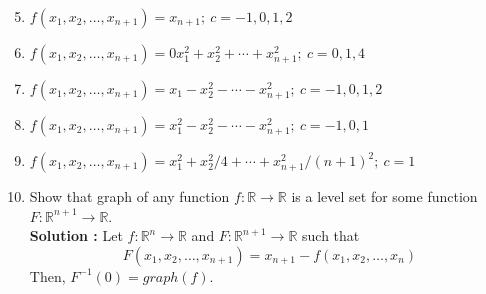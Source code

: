 \begin{enumerate} 
	\setcounter{enumi}{4}
	\item $f(x_1,x_2,\dots,x_{n+1}) = x_{n+1};\ c = -1,0,1,2$
	\item $f(x_1,x_2,\dots,x_{n+1}) = 0x_1^2 + x_2^2 + \dotsb + x_{n+1}^2;\ c = 0,1,4$
	\item $f(x_1,x_2,\dots,x_{n+1}) = x_1 - x_2^2 -\dotsb - x_{n+1}^2;\ c = -1,0,1,2$
	\item $f(x_1,x_2,\dots,x_{n+1}) = x_1^2 - x_2^2 - \dotsb - x_{n+1}^2;\ c = -1,0,1$
	\item $f(x_1,x_2,\dots,x_{n+1}) = x_1^2 + x_2^2/4 + \dotsb + x_{n+1}^2/(n+1)^2;\ c = 1$
	\item Show that graph of any function $f : \mathbb{R} \to \mathbb{R}$ is a level set for some function $F : \mathbb{R}^{n+1} \to \mathbb{R}$.\\

	\textbf{Solution : }
	Let $f : \mathbb{R}^n \to \mathbb{R}$ and $F : \mathbb{R}^{n+1} \to \mathbb{R}$ such that 
	$$F(x_1,x_2,\dots,x_{n+1}) = x_{n+1}-f(x_1,x_2,\dots,x_n)$$
	Then, $F^{-1}(0) = graph(f)$.
\end{enumerate}

